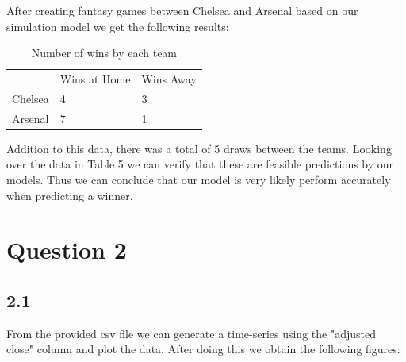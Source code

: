 \documentclass[12pt]{report}
\begin{document}
\vspace{0.3cm}
\noindent
After creating fantasy games between Chelsea and Arsenal based on our simulation model we get the following results:

\begin{table}[ht]
\centering
\caption{Number of wins by each team}
\label{t6}
\begin{tabular}{lll}
        & Wins at Home & Wins Away \\
Chelsea & 4            & 3         \\
Arsenal & 7            & 1        
\end{tabular}
\end{table}

\noindent
Addition to this data, there was a total of 5 draws between the teams. Looking over the data in Table 5 we can verify that these are feasible predictions by our models. Thus we can conclude that our model is very likely perform accurately when predicting a winner.  

\newpage
\section{Question 2}
\subsection{2.1}

From the provided csv file we can generate a time-series using the "adjusted close" column and plot the data. After doing this we obtain the following figures:
\end{document}
